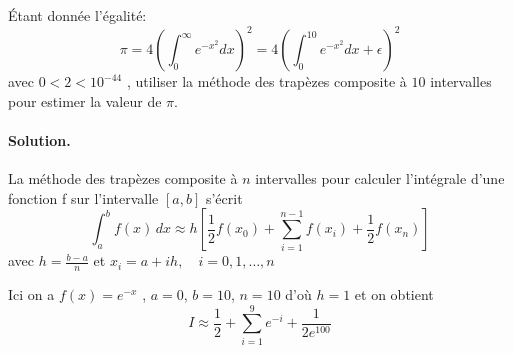 \documentclass[%
oneside,                 %
final,                   %
10pt,french]{article}
\newenvironment{doconceexercise}{}{}
\newcounter{doconceexercisecounter}
\begin{document}
\begin{doconceexercise}



Étant donnée l'égalité:
\begin{equation}
\pi = 4 \left( \int_0^\infty e^{-x^2} dx \right)^2 = 4 \left( \int_0^{10} e^{-x^2} dx + \epsilon \right)^2
\end{equation}
avec $0 < 2 < 10^{−44}$ , utiliser la méthode des trapèzes composite à $10$ intervalles pour estimer la valeur de $\pi$.


\paragraph{Solution.}
La méthode des trapèzes composite à $n$ intervalles pour calculer l’intégrale d’une fonction f sur l’intervalle $[a, b]$ s’écrit
\begin{equation*}
\int_a^b f(x)\,dx \approx h \left[\frac{1}{2}f(x_0) + \sum_{i=1}^{n-1}f(x_i) + \frac{1}{2}f(x_n) \right]
\end{equation*}
avec $h = \frac{b-a}{n}$ et $x_i = a + ih,\quad i = 0,1,\ldots,n$

Ici on a $f (x) = e^{-x}$ , $a = 0$, $b = 10$, $n = 10$ d’où $h = 1$ et on obtient
\begin{equation*}
I \approx \frac{1}{2} + \sum_{i=1}^{9} e^{-i} + \frac{1}{2e^{100}}
\end{equation*}


\end{doconceexercise}



\end{document}
